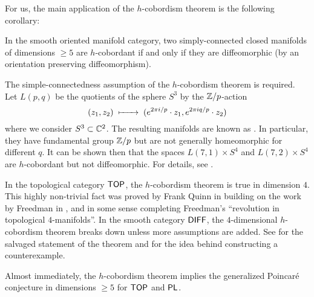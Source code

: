 For us, the main application of the $h$-cobordism theorem is the following corollary:

\begin{corollary}\label{thm:h-cobordism-diffeomorphism}
	In the smooth oriented manifold category, two simply-connected closed manifolds of dimensions $\geq 5$ are $h$-cobordant if and only if they are diffeomorphic (by an orientation preserving diffeomorphism).
\end{corollary}

\begin{remark*}
	The simple-connectedness assumption of the $h$-cobordism theorem is required. Let $L(p,q)$ be the quotients of the sphere $S^3$ by the $\mathbb{Z}/p$-action 
	\[
		(z_1,z_2) \lkxmapsto (e^{2\pi i/p}\cdot z_1, e^{2\pi i q/p}\cdot z_2)
	\]
	where we consider $S^3\subset \mathbb{C}^2$. The resulting manifolds are known as .  In particular, they have fundamental group $\mathbb{Z}/p$ but are not generally homeomorphic for different $q$. It can be shown then that the spaces $L(7,1)\times S^4$ and $L(7,2)\times S^4$ are $h$-cobordant but not diffeomorphic. For details, see \cite{counterexamples2022}.
\end{remark*}

\begin{remark*}
	In the topological category $\mathsf{TOP}$, the $h$-cobordism theorem is true in dimension $4$. This highly non-trivial fact was proved by Frank Quinn in \cite{quinn1982} building on the work by Freedman in \cite{freedman1982manifold}, and in some sense completing Freedman's ``revolution in topological $4$-manifolds''. In the smooth category $\mathsf{DIFF}$, the $4$-dimensional $h$-cobordism theorem breaks down unless more assumptions are added. See \cite{cfhs1996hcobordism} for the salvaged statement of the theorem and \cite{akbulut1991} for the idea behind constructing a counterexample.
\end{remark*}

Almost immediately, the $h$-cobordism theorem implies the generalized Poincar\'e conjecture in dimensions $\geq 5$ for $\mathsf{TOP}$ and $\mathsf{PL}$. 

